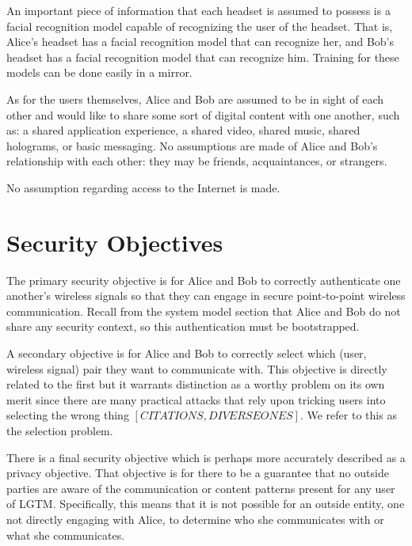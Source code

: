 \documentclass[12pt]{report}
\begin{document}
An important piece of information that each headset is assumed to possess is a facial recognition model capable of recognizing the user of the headset. That is, Alice's headset has a facial recognition model that can recognize her, and Bob's headset has a facial recognition model that can recognize him. Training for these models can be done easily in a mirror.

As for the users themselves, Alice and Bob are assumed to be in sight of each other and would like to share some sort of digital content with one another, such as: a shared application experience, a shared video, shared music, shared holograms, or basic messaging. No assumptions are made of Alice and Bob's relationship with each other: they may be friends, acquaintances, or strangers.

No assumption regarding access to the Internet is made. 

\section{Security Objectives}
The primary security objective is for Alice and Bob to correctly authenticate one another's wireless signals so that they can engage in secure point-to-point wireless communication. Recall from the system model section that Alice and Bob do not share any security context, so this authentication must be bootstrapped. 

A secondary objective is for Alice and Bob to correctly select which (user, wireless signal) pair they want to communicate with. This objective is directly related to the first but it warrants distinction as a worthy problem on its own merit since there are many practical attacks that rely upon tricking users into selecting the wrong thing $[CITATIONS, DIVERSE ONES]$. We refer to this as the selection problem.

There is a final security objective which is perhaps more accurately described as a privacy objective. That objective is for there to be a guarantee that no outside parties are aware of the communication or content patterns present for any user of LGTM. Specifically, this means that it is not possible for an outside entity, one not directly engaging with Alice, to determine who she communicates with or what she communicates. 
\end{document}
